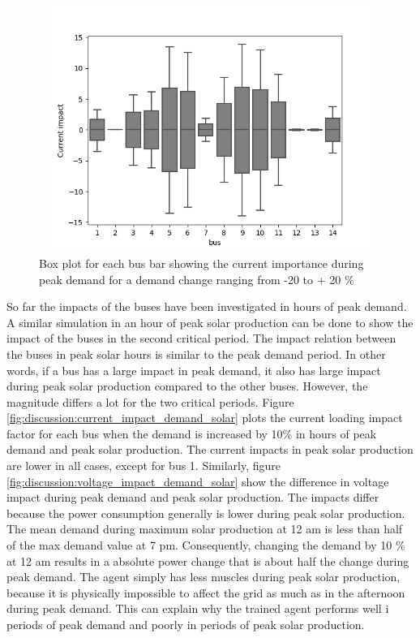 \documentclass[class=book, crop=false]{standalone}
\begin{document}
\begin{figure}[h]
    \center
\includegraphics[height=8cm, width=12cm]{figures/current_impact.png}
    \caption[size = 9]{Box plot for each bus bar showing the current importance during peak demand for a demand change ranging from -20 to + 20 \%}
    \label{fig:discussion:current_impact}
\end{figure}

So far the impacts of the buses have been investigated in hours of peak demand. A similar simulation in an hour of peak solar production can be done to show the impact of the buses in the second critical period. The impact relation between the buses in peak solar hours is similar to the peak demand period. In other words, if a bus has a large impact in peak demand, it also has large impact during peak solar production compared to the other buses. However, the magnitude differs a lot for the two critical periods. Figure \ref{fig:discussion:current_impact_demand_solar} plots the current loading impact factor for each bus when the demand is increased by 10\% in hours of peak demand and peak solar production. The current impacts in peak solar production are lower in all cases, except for bus 1. Similarly, figure     \ref{fig:discussion:voltage_impact_demand_solar} show the difference in voltage impact during peak demand and peak solar production. The impacts differ because the power consumption generally is lower during peak solar production. The mean demand during maximum solar production at 12 am is less than half of the max demand value at 7 pm. Consequently, changing the demand by 10 \% at 12 am results in a absolute power change that is about half the change during peak demand. The agent simply has less muscles during peak solar production, because it is physically impossible to affect the grid as much as in the afternoon during peak demand. This can explain why the trained agent performs well i periods of peak demand and poorly in periods of peak solar production.
\end{document}
